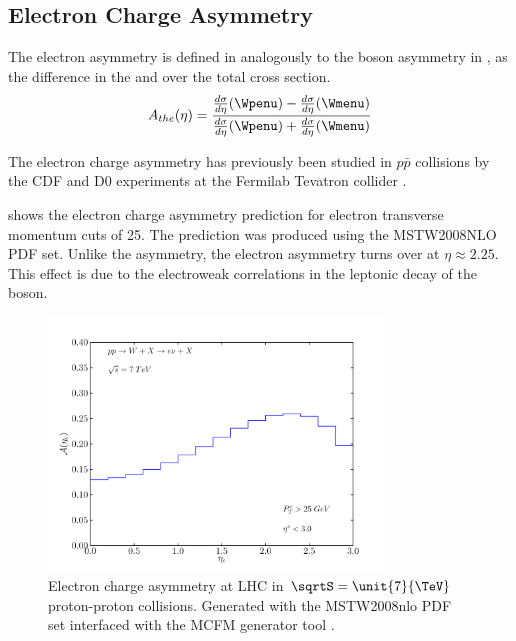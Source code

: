 \subsection{Electron Charge Asymmetry}

The electron asymmetry is defined in  analogously to the
\PW boson asymmetry in , as the difference in the
\HepProcess{\PWplus \to \APelectron} and \HepProcess{\PWminus \to \Pelectron}
over the total \inclusiveWe cross section.
\begin{equation}
A_{the}(\eta)=\frac
  { \frac{d\sigma}{d\eta}(\Wpenu) - \frac{d\sigma}{d\eta}(\Wmenu) }
  { \frac{d\sigma}{d\eta}(\Wpenu) + \frac{d\sigma}{d\eta}(\Wmenu) }
\label{eq:AsymThe}
\end{equation} 

The electron charge asymmetry has previously been studied in $p\bar{p}$
collisions by the CDF and D0 experiments at the Fermilab Tevatron collider
\cite{cdfWAsym,d0WAsym}. 

 shows the electron charge asymmetry prediction for
electron transverse momentum cuts of \unit{25}{\GeV}. The prediction was
produced using the MSTW2008NLO PDF\cite{martin2009parton} set.
Unlike the \PW asymmetry, the electron asymmetry turns over at $\eta\approx
2.25$. This effect is due to the electroweak correlations in the leptonic decay of
the \PW boson.

\begin{figure}[htbp]
  \centering
  \includegraphics[width=0.8\textwidth]{lepton-asym}
  \caption[Electron charge asymmetry at LHC in ${\sqrtS=\unit{7}{\TeV}}$
proton-proton collisions.] {Electron charge asymmetry at LHC in
$\sqrtS=\unit{7}{\TeV}$ proton-proton collisions.  Generated with the
MSTW2008nlo PDF set\cite{martin2009parton} interfaced with the MCFM generator tool
\cite{campbellmcfm}.}
  \label{wbos:asym_simple}
\end{figure}

